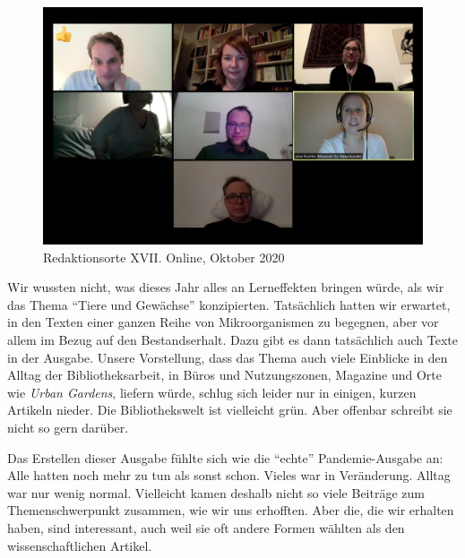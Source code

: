 \documentclass[a4paper,
fontsize=11pt,
oneside,
numbers=noperiodatend,
parskip=half-,
bibliography=totoc,
final
]{scrartcl}
\begin{document}
\begin{figure}
\centering
\includegraphics{img/redaktionsorte.png}
\caption{Redaktionsorte XVII. Online, Oktober 2020}
\end{figure}

Wir wussten nicht, was dieses Jahr alles an Lerneffekten bringen würde,
als wir das Thema \enquote{Tiere und Gewächse} konzipierten. Tatsächlich
hatten wir erwartet, in den Texten einer ganzen Reihe von
Mikroorganismen zu begegnen, aber vor allem im Bezug auf den
Bestandserhalt. Dazu gibt es dann tatsächlich auch Texte in der Ausgabe.
Unsere Vorstellung, dass das Thema auch viele Einblicke in den Alltag
der Bibliotheksarbeit, in Büros und Nutzungszonen, Magazine und Orte wie
\emph{Urban Gardens}, liefern würde, schlug sich leider nur in einigen,
kurzen Artikeln nieder. Die Bibliothekswelt ist vielleicht grün. Aber
offenbar schreibt sie nicht so gern darüber.

Das Erstellen dieser Ausgabe fühlte sich wie die \enquote{echte}
Pandemie-Ausgabe an: Alle hatten noch mehr zu tun als sonst schon.
Vieles war in Veränderung. Alltag war nur wenig normal. Vielleicht kamen
deshalb nicht so viele Beiträge zum Themenschwerpunkt zusammen, wie wir
uns erhofften. Aber die, die wir erhalten haben, sind interessant, auch
weil sie oft andere Formen wählten als den wissenschaftlichen Artikel.
\end{document}
